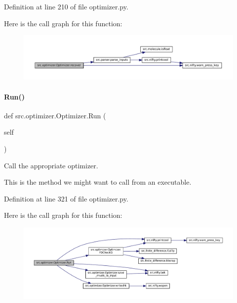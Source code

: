Definition at line 210 of file optimizer.\+py.

Here is the call graph for this function\+:
\nopagebreak
\begin{figure}[H]
\begin{center}
\leavevmode
\includegraphics[width=350pt]{classsrc_1_1optimizer_1_1Optimizer_af63201bdb35965f56f59d1c2a859e9d1_cgraph}
\end{center}
\end{figure}
\mbox{\label{classsrc_1_1optimizer_1_1Optimizer_adddfd056a9bc782ac5313590a82733e3}} 
\paragraph{\texorpdfstring{Run()}{Run()}}
{\footnotesize\ttfamily def src.\+optimizer.\+Optimizer.\+Run (\begin{DoxyParamCaption}\item[{}]{self }\end{DoxyParamCaption})}



Call the appropriate optimizer. 

This is the method we might want to call from an executable. 

Definition at line 321 of file optimizer.\+py.

Here is the call graph for this function\+:
\nopagebreak
\begin{figure}[H]
\begin{center}
\leavevmode
\includegraphics[width=350pt]{classsrc_1_1optimizer_1_1Optimizer_adddfd056a9bc782ac5313590a82733e3_cgraph}
\end{center}
\end{figure}
\mbox{\label{classsrc_1_1optimizer_1_1Optimizer_ad9b6a3c28ccacbbe26504e1e7676b244}} 
